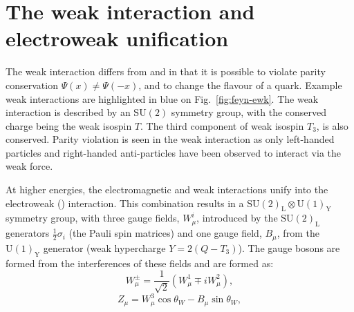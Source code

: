 \section{The weak interaction and electroweak unification}
\label{sec:EWK}

The weak interaction differs from \QED{} and \QCD{} in that it is possible to violate parity conservation $\Psi(x)\neq\Psi(-x)$, and to change the flavour of a quark. 
Example weak interactions are highlighted in blue on Fig.~\ref{fig:feyn-ewk}.
The weak interaction is described by an $\mathrm{SU(2)}$ symmetry group, with the conserved charge being the weak isospin $T$.
The third component of weak isospin $T_{3}$, is also conserved.
Parity violation is seen in the weak interaction as only left-handed particles and right-handed anti-particles have been observed to interact via the weak force. 

At higher energies, the electromagnetic and weak interactions unify into the electroweak (\EWK{}) interaction.
This combination results in a \ensuremath{\mathrm{SU(2)_{L}}\otimes\mathrm{U(1)_{Y}}} symmetry group, with three gauge fields, $W^{i}_{\mu}$, introduced by the $\mathrm{SU(2)_{L}}$ generators $\frac{1}{2}\sigma_{i}$ (the Pauli spin matrices) and one gauge field, $B_{\mu}$, from the $\mathrm{U(1)_{Y}}$ generator (weak hypercharge $Y = 2(Q-T_{3})$).
The \EWK{} gauge bosons are formed from the interferences of these fields and are formed as:
\begin{equation}
	W^{\pm}_{\mu} = \frac{1}{\sqrt{2}}(W^{1}_{\mu} \mp iW^{2}_{\mu}),
\end{equation}
\begin{equation}
	Z_{\mu} = W^{3}_{\mu}\cos{\theta_{W}} -  B_{\mu}\sin{\theta_{W}},
\end{equation}
